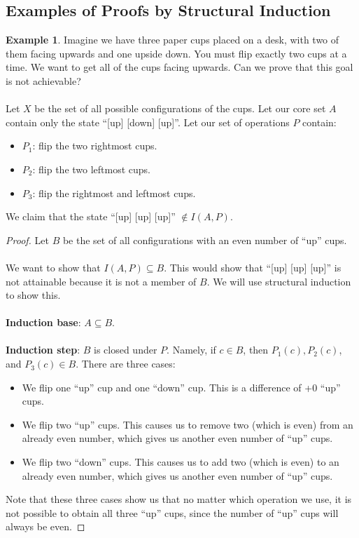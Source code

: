 \documentclass[]{article}
\theoremstyle{definition}
\newtheorem{ex}{Example}[section]
\begin{document}
      \subsection{Examples of Proofs by Structural Induction}
        \begin{ex}
          Imagine we have three paper cups placed on a desk, with two of them facing upwards and one upside down. You must flip exactly two cups at a time. We want to get all of the cups facing upwards. Can we prove that this goal is not achievable?
          \\ \\
          Let $X$ be the set of all possible configurations of the cups. Let our core set $A$ contain only the state ``[up] [down] [up]''. Let our set of operations $P$ contain:
          \begin{itemize}
            \item $P_1$: flip the two rightmost cups.
            \item $P_2$: flip the two leftmost cups.
            \item $P_3$: flip the rightmost and leftmost cups.
          \end{itemize}

          We claim that the state ``[up] [up] [up]'' $\not \in I(A, P)$.
          \begin{proof}
            Let $B$ be the set of all configurations with an even number of ``up'' cups.
            \\ \\
            We want to show that $I(A, P) \subseteq B$. This would show that ``[up] [up] [up]'' is not attainable because it is not a member of $B$. We will use structural induction to show this.
            \\ \\
            \textbf{Induction base}: $A \subseteq B$.
            \\ \\
            \textbf{Induction step}: $B$ is closed under $P$. Namely, if $c \in B$, then $P_1(c), P_2(c)$, and $P_3(c) \in B$. There are three cases:
            \begin{itemize}
              \item We flip one ``up'' cup and one ``down'' cup. This is a difference of +0 ``up'' cups.
              \item We flip two ``up'' cups. This causes us to remove two (which is even) from an already even number, which gives us another even number of ``up'' cups.
              \item We flip two ``down'' cups. This causes us to add two (which is even) to an already even number, which gives us another even number of ``up'' cups.
            \end{itemize}

            Note that these three cases show us that no matter which operation we use, it is not possible to obtain all three ``up'' cups, since the number of ``up'' cups will always be even.
          \end{proof}
        \end{ex}
\end{document}
